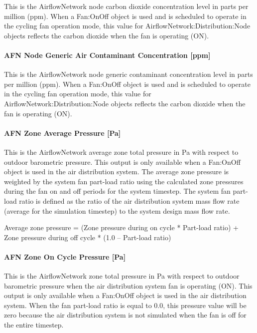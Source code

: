 This is the AirflowNetwork node carbon dioxide concentration level in parts per million (ppm). When a Fan:OnOff object is used and is scheduled to operate in the cycling fan operation mode, this value for AirflowNetwork:Distribution:Node objects reflects the carbon dioxide when the fan is operating (ON).

\paragraph{AFN Node Generic Air Contaminant Concentration {[}ppm{]}}\label{afn-node-generic-air-contaminant-concentration-ppm}

This is the AirflowNetwork node generic contaminant concentration level in parts per million (ppm). When a Fan:OnOff object is used and is scheduled to operate in the cycling fan operation mode, this value for AirflowNetwork:Distribution:Node objects reflects the carbon dioxide when the fan is operating (ON).

\paragraph{AFN Zone Average Pressure {[}Pa{]}}\label{afn-zone-average-pressure-pa}

This is the AirflowNetwork average zone total pressure in Pa with respect to outdoor barometric pressure. This output is only available when a Fan:OnOff object is used in the air distribution system. The average zone pressure is weighted by the system fan part-load ratio using the calculated zone pressures during the fan on and off periods for the system timestep. The system fan part-load ratio is defined as the ratio of the air distribution system mass flow rate (average for the simulation timestep) to the system design mass flow rate.

Average zone pressure = (Zone pressure during on cycle * Part-load ratio) + Zone pressure during off cycle * (1.0 -- Part-load ratio)

\paragraph{AFN Zone On Cycle Pressure {[}Pa{]}}\label{afn-zone-on-cycle-pressure-pa}

This is the AirflowNetwork zone total pressure in Pa with respect to outdoor barometric pressure when the air distribution system fan is operating (ON). This output is only available when a Fan:OnOff object is used in the air distribution system. When the fan part-load ratio is equal to 0.0, this pressure value will be zero because the air distribution system is not simulated when the fan is off for the entire timestep.

